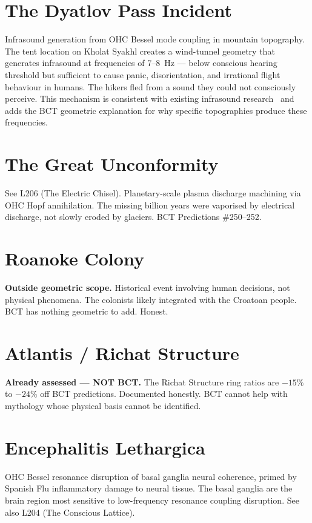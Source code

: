 \documentclass[aps,prl,twocolumn,superscriptaddress]{revtex4-2}
\begin{document}
\section{The Dyatlov Pass Incident}

Infrasound generation from OHC Bessel mode coupling in mountain topography. The tent location on Kholat Syakhl creates a wind-tunnel geometry that generates infrasound at frequencies of 7--8~Hz --- below conscious hearing threshold but sufficient to cause panic, disorientation, and irrational flight behaviour in humans. The hikers fled from a sound they could not consciously perceive. This mechanism is consistent with existing infrasound research~\cite{Gaume2021} and adds the BCT geometric explanation for why specific topographies produce these frequencies.

\section{The Great Unconformity}

See L206 (The Electric Chisel). Planetary-scale plasma discharge machining via OHC Hopf annihilation. The missing billion years were vaporised by electrical discharge, not slowly eroded by glaciers. BCT Predictions \#250--252.

\section{Roanoke Colony}

\textbf{Outside geometric scope.} Historical event involving human decisions, not physical phenomena. The colonists likely integrated with the Croatoan people. BCT has nothing geometric to add. Honest.

\section{Atlantis / Richat Structure}

\textbf{Already assessed --- NOT BCT.} The Richat Structure ring ratios are $-15\%$ to $-24\%$ off BCT predictions. Documented honestly. BCT cannot help with mythology whose physical basis cannot be identified.

\section{Encephalitis Lethargica}

OHC Bessel resonance disruption of basal ganglia neural coherence, primed by Spanish Flu inflammatory damage to neural tissue. The basal ganglia are the brain region most sensitive to low-frequency resonance coupling disruption. See also L204 (The Conscious Lattice).
\end{document}

